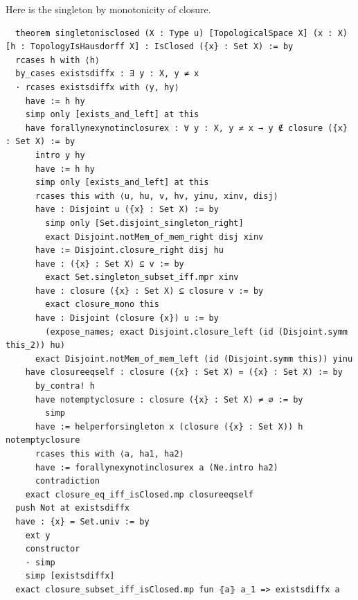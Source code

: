 \documentclass[11pt]{article}
\begin{document}
Here is the singleton by monotonicity of closure. 
\begin{verbatim}
  theorem singletonisclosed (X : Type u) [TopologicalSpace X] (x : X) [h : TopologyIsHausdorff X] : IsClosed ({x} : Set X) := by
  rcases h with ⟨h⟩
  by_cases existsdiffx : ∃ y : X, y ≠ x 
  · rcases existsdiffx with ⟨y, hy⟩
    have := h hy 
    simp only [exists_and_left] at this 
    have forallynexynotinclosurex : ∀ y : X, y ≠ x → y ∉ closure ({x} : Set X) := by 
      intro y hy
      have := h hy 
      simp only [exists_and_left] at this
      rcases this with ⟨u, hu, v, hv, yinu, xinv, disj⟩
      have : Disjoint u ({x} : Set X) := by 
        simp only [Set.disjoint_singleton_right]
        exact Disjoint.notMem_of_mem_right disj xinv
      have := Disjoint.closure_right disj hu 
      have : ({x} : Set X) ⊆ v := by 
        exact Set.singleton_subset_iff.mpr xinv
      have : closure ({x} : Set X) ⊆ closure v := by 
        exact closure_mono this
      have : Disjoint (closure {x}) u := by 
        (expose_names; exact Disjoint.closure_left (id (Disjoint.symm this_2)) hu)
      exact Disjoint.notMem_of_mem_left (id (Disjoint.symm this)) yinu
    have closureeqself : closure ({x} : Set X) = ({x} : Set X) := by 
      by_contra! h
      have notemptyclosure : closure ({x} : Set X) ≠ ∅ := by 
        simp 
      have := helperforsingleton x (closure ({x} : Set X)) h notemptyclosure 
      rcases this with ⟨a, ha1, ha2⟩
      have := forallynexynotinclosurex a (Ne.intro ha2) 
      contradiction
    exact closure_eq_iff_isClosed.mp closureeqself
  push Not at existsdiffx 
  have : {x} = Set.univ := by 
    ext y 
    constructor
    · simp
    simp [existsdiffx] 
  exact closure_subset_iff_isClosed.mp fun ⦃a⦄ a_1 => existsdiffx a
\end{verbatim}

\end{document}
